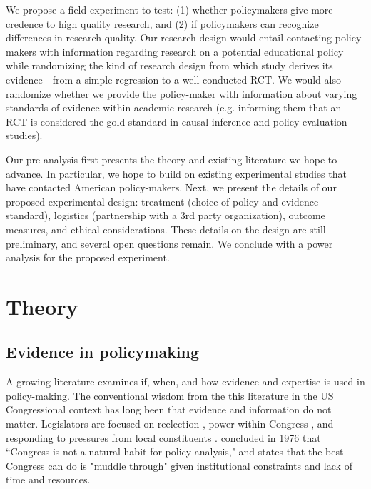 \documentclass[12pt,final,fleqn]{article}
\theoremstyle{plain}
\begin{document}
We propose a field experiment to test: (1) whether policymakers give more credence to high quality research, and (2) if policymakers can recognize differences in research quality. Our research design would entail contacting policy-makers with information regarding research on a potential educational policy while randomizing the kind of research design from which study derives its evidence - from a simple regression to a well-conducted RCT. We would also randomize whether we provide the policy-maker with information about varying standards of evidence within academic research (e.g. informing them that an RCT is considered the gold standard in causal inference and policy evaluation studies). 

Our pre-analysis first presents the theory and existing literature we hope to advance. In particular, we hope to build on existing experimental studies that have contacted American policy-makers. Next, we present the details of our proposed experimental design: treatment (choice of policy and evidence standard), logistics (partnership with a 3rd party organization), outcome measures, and ethical considerations. These details on the design are still preliminary, and several open questions remain. We conclude with a power analysis for the proposed experiment.


\section{Theory} \label{sec:Theory}
\subsection{Evidence in policymaking}  \label{sec: evidence}

A growing literature examines if, when, and how evidence and expertise is used in policy-making. The conventional wisdom from the this literature in the US Congressional context has long been that evidence and information do not matter. Legislators are focused on reelection \citep{mayhew1974congress}, power within Congress \citep{fenno1973congressmen}, and responding to pressures from local constituents \citep{fenno2002home}. \citet{schick1976supply} concluded in 1976 that ``Congress is not a natural habit for policy analysis," and \citet{lindblom2018science} states that the best Congress can do is "muddle through" given institutional constraints and lack of time and resources. 
\end{document}
